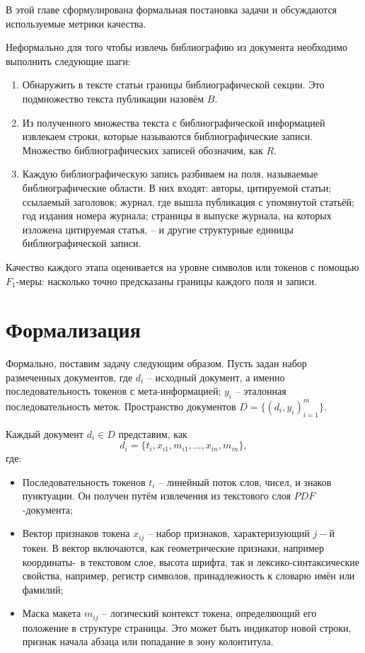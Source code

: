 В этой главе сформулирована формальная постановка задачи и обсуждаются используемые метрики качества.

Неформально для того чтобы извлечь библиографию из документа необходимо выполнить следующие шаги:
\begin{enumerate}
    \item Обнаружить в тексте статьи границы библиографической секции. Это подмножество текста публикации назовём $B$.
    \item Из полученного множества текста с библиографической информацией извлекаем строки, которые называются библиографические записи. Множество библиографических записей обозначим, как $R$.
    \item Каждую библиографическую запись разбиваем на поля, называемые библиографические области. В них входят: авторы, цитируемой статьи; ссылаемый заголовок; журнал, где вышла публикация с упомянутой статьёй; год издания номера журнала; страницы в выпуске журнала, на которых изложена цитируемая статья, -- и другие структурные единицы библиографической записи.
\end{enumerate}

Качество каждого этапа оценивается на уровне символов или токенов с помощью $F_1$-меры: насколько точно предсказаны границы каждого поля и записи.

\section{Формализация}

Формально, поставим задачу следующим образом. Пусть задан набор размеченных документов, где $d_i$ -- исходный документ, а именно последовательность токенов с мета-информацией; $y_i$ -- эталонная последовательность меток. Пространство документов $D=\{(d_i,y_i)_{i=1}^m\}$.

Каждый документ $d_i\in D$ представим, как
\begin{equation}
    d_i = \{t_i,x_{i1},m_{i1},\dots,x_{in},m_{in}\},
\end{equation}
где:
\begin{itemize}
    \item Последовательность токенов $t_i$ -- линейный поток слов, чисел, и знаков пунктуации. Он получен путём извлечения из текстового слоя $PDF$-документа; 
    \item Вектор признаков токена $x_{ij}$ -- набор признаков, характеризующий $j-$й токен. В вектор включаются, как геометрические признаки, например координаты-\guillemotright~в текстовом слое, высота шрифта, так и лексико-синтаксические свойства, например, регистр символов, принадлежность к словарю имён или фамилий;
    \item Маска макета $m_{ij}$ -- логический контекст токена, определяющий его положение в структуре страницы. Это может быть индикатор новой строки, признак начала абзаца или попадание в зону колонтитула.
\end{itemize}

